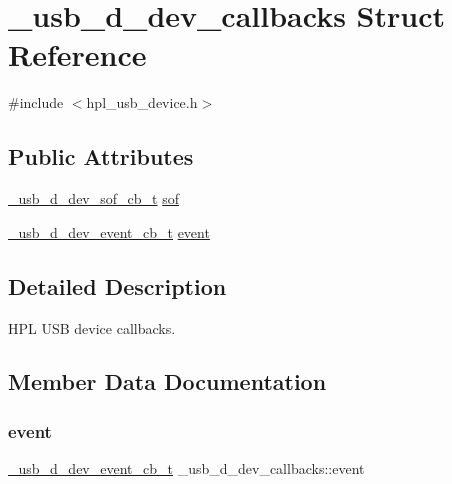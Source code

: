 \hypertarget{struct__usb__d__dev__callbacks}{}\section{\+\_\+usb\+\_\+d\+\_\+dev\+\_\+callbacks Struct Reference}
\label{struct__usb__d__dev__callbacks}


{\ttfamily \#include $<$hpl\+\_\+usb\+\_\+device.\+h$>$}

\subsection*{Public Attributes}
\begin{DoxyCompactItemize}
\item 
\hyperlink{hpl__usb__device_8h_a1e88b838737e28bdde5f01990388acf3}{\+\_\+usb\+\_\+d\+\_\+dev\+\_\+sof\+\_\+cb\+\_\+t} \hyperlink{struct__usb__d__dev__callbacks_a00d27a1f4163f958e060785f5b67e34f}{sof}
\item 
\hyperlink{hpl__usb__device_8h_afe5681ede3074b44fdd7ac24d3522a01}{\+\_\+usb\+\_\+d\+\_\+dev\+\_\+event\+\_\+cb\+\_\+t} \hyperlink{struct__usb__d__dev__callbacks_ab1c68c3ea44d192c56c5707532fff060}{event}
\end{DoxyCompactItemize}


\subsection{Detailed Description}
H\+PL U\+SB device callbacks. 

\subsection{Member Data Documentation}
\mbox{\label{struct__usb__d__dev__callbacks_ab1c68c3ea44d192c56c5707532fff060}} 
\subsubsection{\texorpdfstring{event}{event}}
{\footnotesize\ttfamily \hyperlink{hpl__usb__device_8h_afe5681ede3074b44fdd7ac24d3522a01}{\+\_\+usb\+\_\+d\+\_\+dev\+\_\+event\+\_\+cb\+\_\+t} \+\_\+usb\+\_\+d\+\_\+dev\+\_\+callbacks\+::event}

